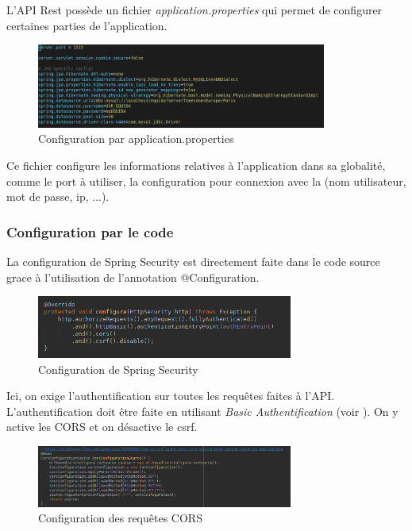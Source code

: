 			L'API Rest possède un fichier \textit{application.properties} qui permet de configurer certaines parties de l'application.

			\begin{figure}[H]
				\centering\includegraphics[width=0.85\textwidth, keepaspectratio]{res/application-properties.png}
				\caption{Configuration par application.properties}
			\end{figure}

			\noindent
			Ce fichier configure les informations relatives à l'application dans sa globalité, comme le port à utiliser, la configuration pour connexion avec la \bdd{} (nom utilisateur, mot de passe, ip, ...).

			\subsubsection{Configuration par le code}

			La configuration de Spring Security est directement faite dans le code source grace à l'utilisation de l'annotation @Configuration.

			\begin{figure}[H]
				\centering\includegraphics[width=0.75\textwidth, keepaspectratio]{res/config-httpsecurity.png}
				\caption{Configuration de Spring Security}
			\end{figure}

			\noindent
			Ici, on exige l'authentification sur toutes les requêtes faites à l'API. L'authentification doit être faite en utilisant \textit{Basic Authentification} (voir ). On y active les CORS et on désactive le csrf.

			\begin{figure}[H]
				\centering\includegraphics[width=0.75\textwidth, keepaspectratio]{res/config-cors.png}
				\caption{Configuration des requêtes CORS}
			\end{figure}

